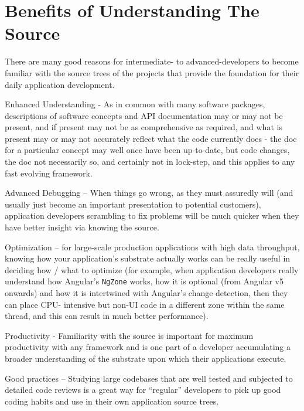 \section{Benefits of Understanding The Source}

There are many good reasons for intermediate- to advanced-developers to become
familiar with the source trees of the projects that provide the foundation for their daily
application development.

Enhanced Understanding - As in common with many software packages, descriptions
of software concepts and API documentation may or may not be present, and if
present may not be as comprehensive as required, and what is present may or may
not accurately reflect what the code currently does - the doc for a particular concept
may well once have been up-to-date, but code changes, the doc not necessarily so,
and certainly not in lock-step, and this applies to any fast evolving framework.

Advanced Debugging – When things go wrong, as they must assuredly will (and
usually just become an important presentation to potential customers), application
developers scrambling to fix problems will be much quicker when they have better
insight via knowing the source.

Optimization – for large-scale production applications with high data throughput,
knowing how your application’s substrate actually works can be really useful in
deciding how / what to optimize (for example, when application developers really
understand how Angular’s
\texttt{NgZone}
works, how it is optional (from Angular v5 onwards)
and how it is intertwined with Angular’s change detection, then they can place CPU-
intensive but non-UI code in a different zone within the same thread, and this can
result in much better performance).

Productivity - Familiarity with the source is important for maximum productivity with
any framework and is one part of a developer accumulating a broader understanding
of the substrate upon which their applications execute.

Good practices – Studying large codebases that are well tested and subjected to
detailed code reviews is a great way for “regular” developers to pick up good coding
habits and use in their own application source trees.
